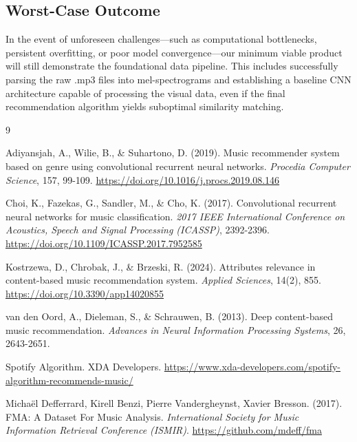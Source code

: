 \documentclass[10pt, twocolumn]{article}
\begin{document}
\subsection*{Worst-Case Outcome}
In the event of unforeseen challenges—such as computational bottlenecks, persistent overfitting, or poor model convergence—our minimum viable product will still demonstrate the foundational data pipeline. This includes successfully parsing the raw .mp3 files into mel-spectrograms and establishing a baseline CNN architecture capable of processing the visual data, even if the final recommendation algorithm yields suboptimal similarity matching.


\begin{thebibliography}{9}

	Adiyansjah, A., Wilie, B., \& Suhartono, D. (2019). Music recommender system based on genre using convolutional recurrent neural networks. \textit{Procedia Computer Science}, 157, 99-109. \url{https://doi.org/10.1016/j.procs.2019.08.146}

	Choi, K., Fazekas, G., Sandler, M., \& Cho, K. (2017). Convolutional recurrent neural networks for music classification. \textit{2017 IEEE International Conference on Acoustics, Speech and Signal Processing (ICASSP)}, 2392-2396. \url{https://doi.org/10.1109/ICASSP.2017.7952585}

	Kostrzewa, D., Chrobak, J., \& Brzeski, R. (2024). Attributes relevance in content-based music recommendation system. \textit{Applied Sciences}, 14(2), 855. \url{https://doi.org/10.3390/app14020855}

	van den Oord, A., Dieleman, S., \& Schrauwen, B. (2013). Deep content-based music recommendation. \textit{Advances in Neural Information Processing Systems}, 26, 2643-2651.

	Spotify Algorithm. XDA Developers. \url{https://www.xda-developers.com/spotify-algorithm-recommends-music/}

	Michaël Defferrard, Kirell Benzi, Pierre Vandergheynst, Xavier Bresson. (2017). FMA: A Dataset For Music Analysis. \textit{International Society for Music Information Retrieval Conference (ISMIR)}. \url{https://github.com/mdeff/fma}

\end{thebibliography}
\end{document}
